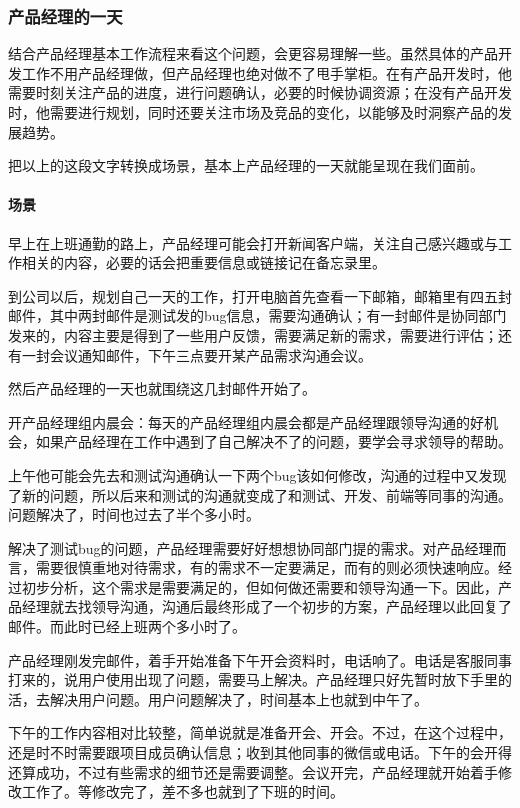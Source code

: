 \documentclass[letterpaper,11pt,english]{sphinxmanual}
\begin{document}
\subsubsection{产品经理的一天}
\label{\detokenize{chapter_experience/1Day:id1}}\label{\detokenize{chapter_experience/1Day::doc}}
结合产品经理基本工作流程来看这个问题，会更容易理解一些。虽然具体的产品开发工作不用产品经理做，但产品经理也绝对做不了甩手掌柜。在有产品开发时，他需要时刻关注产品的进度，进行问题确认，必要的时候协调资源；在没有产品开发时，他需要进行规划，同时还要关注市场及竞品的变化，以能够及时洞察产品的发展趋势。

把以上的这段文字转换成场景，基本上产品经理的一天就能呈现在我们面前。


\paragraph{场景}
\label{\detokenize{chapter_experience/1Day:id2}}
早上在上班通勤的路上，产品经理可能会打开新闻客户端，关注自己感兴趣或与工作相关的内容，必要的话会把重要信息或链接记在备忘录里。

到公司以后，规划自己一天的工作，打开电脑首先查看一下邮箱，邮箱里有四五封邮件，其中两封邮件是测试发的bug信息，需要沟通确认；有一封邮件是协同部门发来的，内容主要是得到了一些用户反馈，需要满足新的需求，需要进行评估；还有一封会议通知邮件，下午三点要开某产品需求沟通会议。

然后产品经理的一天也就围绕这几封邮件开始了。

开产品经理组内晨会：每天的产品经理组内晨会都是产品经理跟领导沟通的好机会，如果产品经理在工作中遇到了自己解决不了的问题，要学会寻求领导的帮助。

上午他可能会先去和测试沟通确认一下两个bug该如何修改，沟通的过程中又发现了新的问题，所以后来和测试的沟通就变成了和测试、开发、前端等同事的沟通。问题解决了，时间也过去了半个多小时。

解决了测试bug的问题，产品经理需要好好想想协同部门提的需求。对产品经理而言，需要很慎重地对待需求，有的需求不一定要满足，而有的则必须快速响应。经过初步分析，这个需求是需要满足的，但如何做还需要和领导沟通一下。因此，产品经理就去找领导沟通，沟通后最终形成了一个初步的方案，产品经理以此回复了邮件。而此时已经上班两个多小时了。

产品经理刚发完邮件，着手开始准备下午开会资料时，电话响了。电话是客服同事打来的，说用户使用出现了问题，需要马上解决。产品经理只好先暂时放下手里的活，去解决用户问题。用户问题解决了，时间基本上也就到中午了。

下午的工作内容相对比较整，简单说就是准备开会、开会。不过，在这个过程中，还是时不时需要跟项目成员确认信息；收到其他同事的微信或电话。下午的会开得还算成功，不过有些需求的细节还是需要调整。会议开完，产品经理就开始着手修改工作了。等修改完了，差不多也就到了下班的时间。
\end{document}
